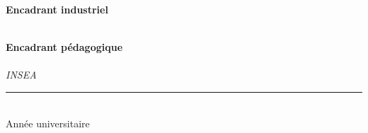 \begin{titlepage}
\vfill

\begin{minipage}[t]{0.47\textwidth}
  \raggedright
  {\bfseries Encadrant industriel}\\[3pt]
  \encadrantEntreprise\\
  {\small\itshape \fonctionEncadrant}
\end{minipage}
\hfill
\begin{minipage}[t]{0.47\textwidth}
  \raggedleft
  {\bfseries Encadrant pédagogique}\\[3pt]
  \encadrantEcole\\
  {\small\itshape INSEA}
\end{minipage}

\vspace{1.4cm}
{\color{ocpbleu}\rule{\textwidth}{1.2pt}}\\[4pt]
{\normalsize Année universitaire \anneeUniv}

\end{titlepage}
\cleardoublepage
